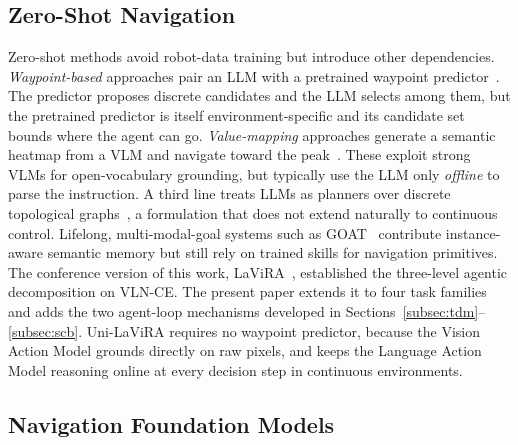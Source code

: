 \documentclass[conference]{IEEEtran}
\newcommand{\ourmethod}{Uni-LaViRA\xspace}
\begin{document}
\subsection{Zero-Shot Navigation}

Zero-shot methods avoid robot-data training but introduce other dependencies.
\emph{Waypoint-based} approaches pair an LLM with a pretrained waypoint
predictor~\cite{qiao2024opennav,shi2025smartway,hong2022bridging}. The
predictor proposes discrete candidates and the LLM selects among them, but the
pretrained predictor is itself environment-specific and its candidate set
bounds where the agent can go. \emph{Value-mapping} approaches generate a
semantic heatmap from a VLM and navigate toward the
peak~\cite{chen2025canav,long2024instructnav,yokoyama2024vlfm,
yin2025gcvln,zhou2023esc,kuang2024openfmnav}. These exploit strong VLMs for
open-vocabulary grounding, but typically use the LLM only \emph{offline} to
parse the instruction. A third line treats LLMs as planners over discrete
topological graphs~\cite{zhou2024navgpt,chen2024mapgpt,long2024discussnav}, a
formulation that does not extend naturally to continuous control. Lifelong,
multi-modal-goal systems such as GOAT~\cite{chang2024goat,khanna2024goatbench}
contribute instance-aware semantic memory but still rely on trained skills for
navigation primitives. {The conference version of this work,
LaViRA~\cite{ding2025lavira}, established the three-level agentic
decomposition on VLN-CE. The present paper extends it to four task families
and adds the two agent-loop mechanisms developed in
Sections~\ref{subsec:tdm}--\ref{subsec:scb}.} \ourmethod requires no waypoint
predictor, because the Vision Action Model grounds directly on raw pixels, and
keeps the Language Action Model reasoning online at every decision step in
continuous environments.

\subsection{Navigation Foundation Models}
\label{subsec:nav_foundation_models}
\end{document}
